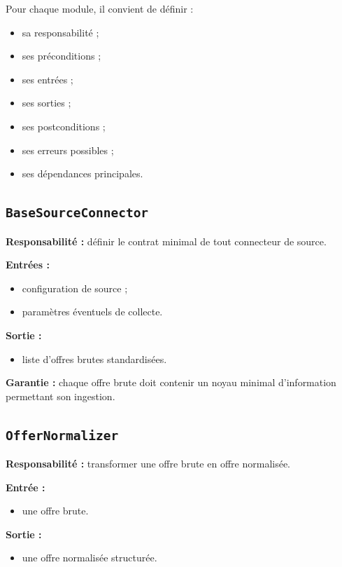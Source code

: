 \documentclass[11pt,a4paper]{article}
\begin{document}
Pour chaque module, il convient de définir :

\begin{itemize}
    \item sa responsabilité ;
    \item ses préconditions ;
    \item ses entrées ;
    \item ses sorties ;
    \item ses postconditions ;
    \item ses erreurs possibles ;
    \item ses dépendances principales.
\end{itemize}

\subsection{\texttt{BaseSourceConnector}}

\textbf{Responsabilité :} définir le contrat minimal de tout connecteur de source.

\textbf{Entrées :}
\begin{itemize}
    \item configuration de source ;
    \item paramètres éventuels de collecte.
\end{itemize}

\textbf{Sortie :}
\begin{itemize}
    \item liste d’offres brutes standardisées.
\end{itemize}

\textbf{Garantie :}
chaque offre brute doit contenir un noyau minimal d’information permettant son ingestion.

\subsection{\texttt{OfferNormalizer}}

\textbf{Responsabilité :} transformer une offre brute en offre normalisée.

\textbf{Entrée :}
\begin{itemize}
    \item une offre brute.
\end{itemize}

\textbf{Sortie :}
\begin{itemize}
    \item une offre normalisée structurée.
\end{itemize}
\end{document}
